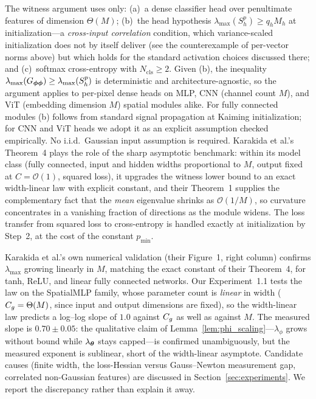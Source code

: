 \begin{remark}
\label{rem:meanfield_scope}
The witness argument uses only: (a)~a dense classifier head over
penultimate features of dimension $\Theta(M)$;
(b)~the head hypothesis $\lambda_{\max}(S_h^{p}) \geq q_h M_h$ at
initialization---a \emph{cross-input correlation} condition, which
variance-scaled initialization does not by itself deliver (see the
counterexample of per-vector norms above) but which holds for the
standard activation choices discussed there; and (c)~softmax
cross-entropy with $N_{\mathrm{cls}} \geq 2$. Given (b), the inequality
$\lambda_{\max}(G_{{\boldsymbol{\phi}}{\boldsymbol{\phi}}}) \geq \lambda_{\max}(S_h^{p})$ is
deterministic and architecture-agnostic, so the argument applies to
per-pixel dense heads on MLP, CNN (channel count $M$), and ViT
(embedding dimension $M$) spatial modules alike. For fully connected
modules (b) follows from standard signal propagation at Kaiming
initialization; for CNN and ViT heads we adopt it as an explicit
assumption checked empirically. No i.i.d.\ Gaussian input assumption
is required. Karakida et al.'s Theorem~4 plays the role of the
sharp asymptotic benchmark: within its model class (fully connected,
input and hidden widths proportional to $M$, output fixed at
$C = \mathcal{O}(1)$, squared loss), it upgrades the
witness lower bound to an exact width-linear law with explicit
constant, and their Theorem~1 supplies the complementary fact that
the \emph{mean} eigenvalue shrinks as $\mathcal{O}(1/M)$, so
curvature concentrates in a vanishing fraction of directions as the
module widens. The loss transfer from squared loss to cross-entropy
is handled exactly at initialization by Step~2, at the cost of the
constant $p_{\min}$.
\end{remark}

\begin{remark}
\label{rem:phi_scaling_empirical}
Karakida et al.'s own numerical validation (their Figure~1, right
column) confirms $\lambda_{\max}$ growing linearly in $M$, matching
the exact constant of their Theorem~4, for tanh, ReLU, and linear
fully connected networks. Our Experiment~1.1 tests the law on the
SpatialMLP family, whose parameter count is \emph{linear} in width
($C_g = \Theta(M)$, since input and output dimensions are fixed), so
the width-linear law predicts a log--log slope of $1.0$ against
$C_g$ as well as against $M$. The measured slope is
$0.70 \pm 0.05$: the qualitative claim of
Lemma~\ref{lem:phi_scaling}---$\lambda_\phi$ grows without bound
while $\lambda_{\boldsymbol{\theta}}$ stays capped---is confirmed unambiguously,
but the measured exponent is sublinear, short of the width-linear
asymptote. Candidate causes (finite width, the loss-Hessian versus
Gauss--Newton measurement gap, correlated non-Gaussian features) are
discussed in Section~\ref{sec:experiments}. We report the
discrepancy rather than explain it away.
\end{remark}


